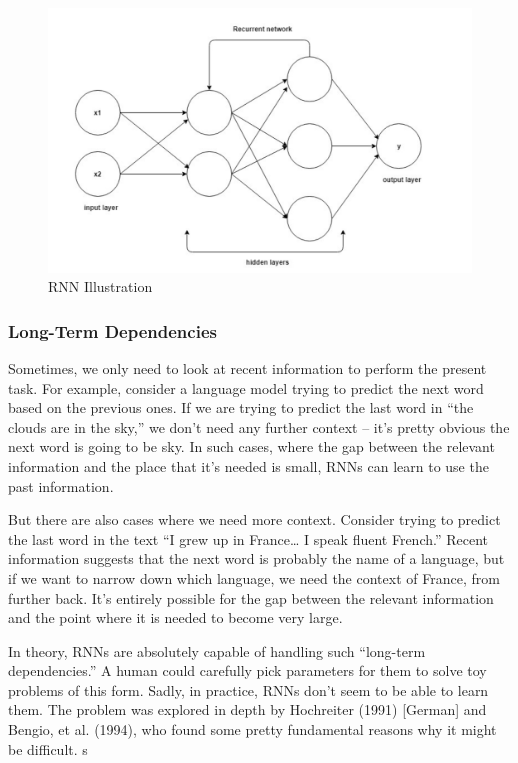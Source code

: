 \begin{figure}[ht]
    \centering
    \includegraphics[scale=0.3]{Images/recurrent-nets.png}
    \caption{RNN Illustration}
    \label{fig:rnnI}
\end{figure}


\subsubsection{Long-Term Dependencies}

Sometimes, we only need to look at recent information to perform the present task. For example, consider a language model trying to predict the next word based on the previous ones. If we are trying to predict the last word in “the clouds are in the sky,” we don’t need any further context – it’s pretty obvious the next word is going to be sky. In such cases, where the gap between the relevant information and the place that it’s needed is small, RNNs can learn to use the past information.


But there are also cases where we need more context. Consider trying to predict the last word in the text “I grew up in France… I speak fluent French.” Recent information suggests that the next word is probably the name of a language, but if we want to narrow down which language, we need the context of France, from further back. It’s entirely possible for the gap between the relevant information and the point where it is needed to become very large.


In theory, RNNs are absolutely capable of handling such “long-term dependencies.” A human could carefully pick parameters for them to solve toy problems of this form. Sadly, in practice, RNNs don’t seem to be able to learn them. The problem was explored in depth by Hochreiter (1991) [German] and Bengio, et al. (1994), who found some pretty fundamental reasons why it might be difficult.
s


